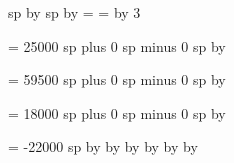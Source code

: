 %
%
%


\newcount\factor
{}


\newdimen\stafflineheight
{} sp 
\multiply\stafflineheight by \the\factor 
\newdimen\interstafflinespace
{} sp 
\multiply\interstafflinespace by \the\factor 
\newdimen\linewidth \linewidth=\hsize 
\newdimen\stafflinewidth \stafflinewidth=\linewidth 
\newdimen\staffheight {}\stafflineheight 
\advance\staffheight by 3\interstafflinespace

\newskip\spaceabovelines
\spaceabovelines = 25000 sp plus 0 sp minus 0 sp
\multiply\spaceabovelines by \factor

\newskip\spacelinestext
\spacelinestext = 59500 sp plus 0 sp minus 0 sp
\multiply\spacelinestext by \factor

\newskip\spacebeneathtext
\spacebeneathtext = 18000 sp plus 0 sp minus 0 sp
\multiply\spacebeneathtext by \factor

\newdimen\constantglyphraise
\constantglyphraise = -22000 sp
\multiply\constantglyphraise by \the\factor
\advance\constantglyphraise\spacebeneathtext
\advance\constantglyphraise by \spacelinestext
\advance\constantglyphraise by \interstafflinespace
\advance\constantglyphraise by \interstafflinespace
\advance\constantglyphraise by \stafflineheight
\advance\constantglyphraise by \stafflineheight

